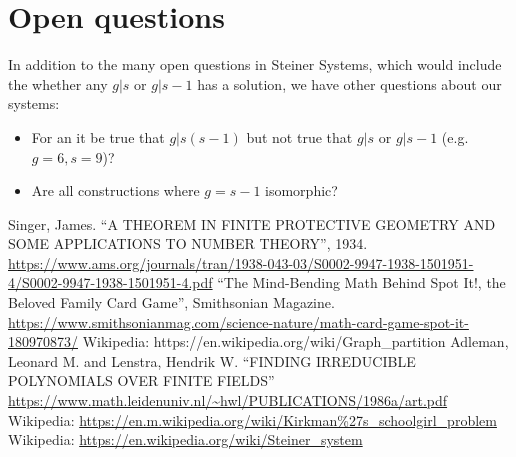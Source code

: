 \documentclass[11pt, oneside]{article} 	%
\begin{document}
\section{Open questions}

In addition to the many open questions in Steiner Systems\cite{6}, which would include the whether any $g | s$ or $g | s-1$ has a solution, we have other questions about our systems:

\begin{itemize}
\item For an it be true that $g | s(s-1)$ but not true that $g | s$ or $g | s-1$ (e.g. $g=6, s=9$)?
\item Are all constructions where $g=s-1$ isomorphic?
\end{itemize}



\begin{thebibliography}{9}
 Singer, James. ``A THEOREM IN FINITE PROTECTIVE GEOMETRY AND SOME APPLICATIONS TO NUMBER THEORY'', 1934. \url{https://www.ams.org/journals/tran/1938-043-03/S0002-9947-1938-1501951-4/S0002-9947-1938-1501951-4.pdf} 
 ``The Mind-Bending Math Behind Spot It!, the Beloved Family Card Game'', Smithsonian Magazine. \url{https://www.smithsonianmag.com/science-nature/math-card-game-spot-it-180970873/}
 Wikipedia: {https://en.wikipedia.org/wiki/Graph\_partition}
 Adleman, Leonard M. and Lenstra, Hendrik W. ``FINDING IRREDUCIBLE POLYNOMIALS OVER FINITE FIELDS'' \url{https://www.math.leidenuniv.nl/~hwl/PUBLICATIONS/1986a/art.pdf}
 Wikipedia: \url{https://en.m.wikipedia.org/wiki/Kirkman\%27s_schoolgirl_problem}
 Wikipedia: \url{https://en.wikipedia.org/wiki/Steiner_system}
\end{thebibliography}
\end{document}
